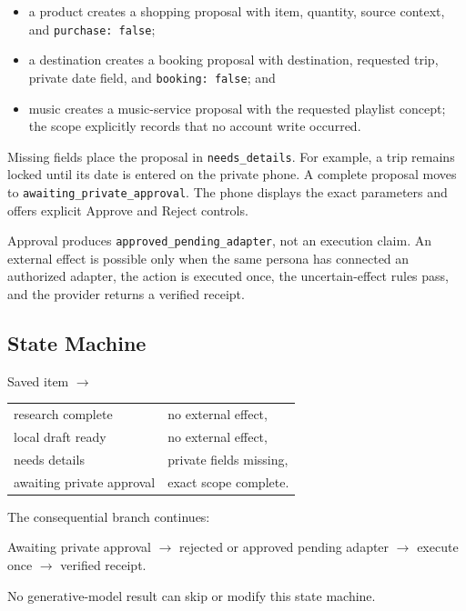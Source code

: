 \begin{itemize}
    \item a product creates a shopping proposal with item, quantity, source
    context, and \texttt{purchase: false};
    \item a destination creates a booking proposal with destination, requested
    trip, private date field, and \texttt{booking: false}; and
    \item music creates a music-service proposal with the requested playlist
    concept; the scope explicitly records that no account write occurred.
\end{itemize}

Missing fields place the proposal in \texttt{needs\_details}.  For example, a
trip remains locked until its date is entered on the private phone.  A complete
proposal moves to \texttt{awaiting\_private\_approval}.  The phone displays the
exact parameters and offers explicit Approve and Reject controls.

Approval produces \texttt{approved\_pending\_adapter}, not an execution claim.
An external effect is possible only when the same persona has connected an
authorized adapter, the action is executed once, the uncertain-effect rules pass,
and the provider returns a verified receipt.

\subsection{State Machine}

\begin{center}
\small
Saved item
$\rightarrow$
\begin{tabular}{ll}
research complete & no external effect,\\
local draft ready & no external effect,\\
needs details & private fields missing,\\
awaiting private approval & exact scope complete.
\end{tabular}
\end{center}

The consequential branch continues:

\begin{center}
\small
Awaiting private approval
$\rightarrow$
rejected \quad or \quad approved pending adapter
$\rightarrow$
execute once
$\rightarrow$
verified receipt.
\end{center}

No generative-model result can skip or modify this state machine.

